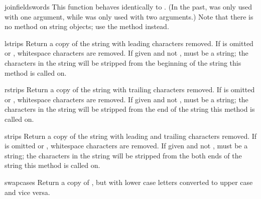 \begin{funcdesc}{joinfields}{words}
  This function behaves identically to .  (In the past, 
   was only used with one argument, while
   was only used with two arguments.)
  Note that there is no  method on string
  objects; use the  method instead.
\end{funcdesc}

\begin{funcdesc}{lstrip}{s}
Return a copy of the string with leading characters removed.  If
 is omitted or , whitespace characters are
removed.  If given and not ,  must be a string;
the characters in the string will be stripped from the beginning of
the string this method is called on.
\end{funcdesc}

\begin{funcdesc}{rstrip}{s}
Return a copy of the string with trailing characters removed.  If
 is omitted or , whitespace characters are
removed.  If given and not ,  must be a string;
the characters in the string will be stripped from the end of the
string this method is called on.
\end{funcdesc}

\begin{funcdesc}{strip}{s}
Return a copy of the string with leading and trailing characters
removed.  If  is omitted or , whitespace
characters are removed.  If given and not , 
must be a string; the characters in the string will be stripped from
the both ends of the string this method is called on.
\end{funcdesc}

\begin{funcdesc}{swapcase}{s}
  Return a copy of , but with lower case letters
  converted to upper case and vice versa.
\end{funcdesc}


